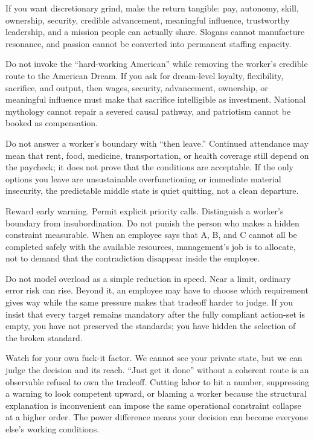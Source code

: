 \documentclass[11pt,oneside]{article}
\begin{document}
If you want discretionary grind, make the return tangible: pay,
autonomy, skill, ownership, security, credible advancement, meaningful
influence, trustworthy leadership, and a mission people can actually
share. Slogans cannot manufacture resonance, and passion cannot be
converted into permanent staffing capacity.

Do not invoke the ``hard-working American'' while removing the worker's
credible route to the American Dream. If you ask for dream-level
loyalty, flexibility, sacrifice, and output, then wages, security,
advancement, ownership, or meaningful influence must make that sacrifice
intelligible as investment. National mythology cannot repair a severed
causal pathway, and patriotism cannot be booked as compensation.

Do not answer a worker's boundary with ``then leave.'' Continued
attendance may mean that rent, food, medicine, transportation, or health
coverage still depend on the paycheck; it does not prove that the
conditions are acceptable. If the only options you leave are
unsustainable overfunctioning or immediate material insecurity, the
predictable middle state is quiet quitting, not a clean departure.

Reward early warning. Permit explicit priority calls. Distinguish a
worker's boundary from insubordination. Do not punish the person who
makes a hidden constraint measurable. When an employee says that A, B,
and C cannot all be completed safely with the available resources,
management's job is to allocate, not to demand that the contradiction
disappear inside the employee.

Do not model overload as a simple reduction in speed. Near a limit,
ordinary error risk can rise. Beyond it, an employee may have to choose
which requirement gives way while the same pressure makes that tradeoff
harder to judge. If you insist that every target remains mandatory after
the fully compliant action-set is empty, you have not preserved the
standards; you have hidden the selection of the broken standard.

Watch for your own fuck-it factor. We cannot see your private state, but
we can judge the decision and its reach. ``Just get it done'' without a
coherent route is an observable refusal to own the tradeoff. Cutting
labor to hit a number, suppressing a warning to look competent upward,
or blaming a worker because the structural explanation is inconvenient
can impose the same operational constraint collapse at a higher order.
The power difference means your decision can become everyone else's
working conditions.
\end{document}
